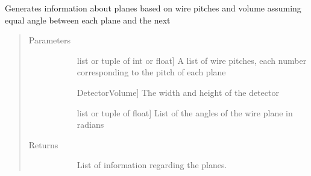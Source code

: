 \documentclass[letterpaper,10pt,english]{sphinxmanual}
\begin{document}

\begin{fulllineitems}
\label{\detokenize{utilities:utilities.generatePlaneInfo}}
Generates information about planes based on wire pitches and volume assuming equal angle between each plane and the next
\begin{quote}\begin{description}
\item[{Parameters}] \leavevmode\begin{description}
\item[{}] \leavevmode{[}list or tuple of int or float{]}
A list of wire pitches, each number corresponding to the pitch of each plane

\item[{}] \leavevmode{[}DetectorVolume{]}
The width and height of the detector

\item[{}] \leavevmode{[}list or tuple of float{]}
List of the angles of the wire plane in radians

\end{description}

\item[{Returns}] \leavevmode\begin{description}
\item[{}] \leavevmode
List of information regarding the planes.

\end{description}

\end{description}\end{quote}

\end{fulllineitems}

\end{document}
